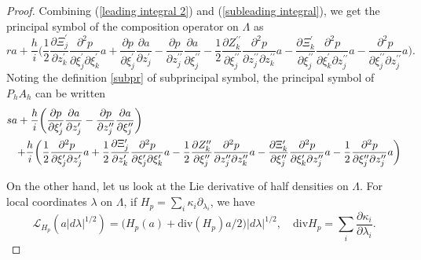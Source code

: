 \documentclass[10pt, a4paper, twoside]{amsart}
\numberwithin{equation}{section}
\theoremstyle{remark}
\begin{document}
\begin{appendix}
\begin{proof}
	Combining (\ref{leading integral 2}) and (\ref{subleading integral}), we get the principal symbol of the composition operator on $\Lambda$ as $$r a + \frac{h}{i}\bigg(\frac{1}{2} \frac{\partial \Xi^\prime_j}{\partial z^\prime_k} \frac{\partial^2 p}{\partial \xi^{\prime}_j \partial \xi^{\prime}_k} a + \frac{\partial p}{\partial \xi_j^\prime}  \frac{\partial a}{\partial z_j^\prime} - \frac{\partial p}{\partial z^{\prime\prime}_j} \frac{\partial a}{\partial \xi^{\prime\prime}_j} - \frac{1}{2} \frac{\partial Z^{\prime\prime}_k}{\partial \xi^{\prime\prime}_j} \frac{\partial^2 p}{\partial z^{\prime\prime}_j \partial z^{\prime\prime}_k} a  - \frac{\partial \Xi^\prime_k}{\partial \xi^{\prime\prime}_j}\frac{\partial^2 p}{\partial \xi^\prime_k \partial z^{\prime\prime}_j} a - \frac{\partial^2 p}{\partial \xi^{\prime\prime}_j \partial z^{\prime\prime}_j} a\bigg).$$ 
	Noting the definition \eqref{subpr} of subprincipal symbol, the principal symbol of $P_hA_h$ can be written  \begin{eqnarray}
	\lefteqn{ sa + \frac{h}{i}\bigg(\frac{\partial p}{\partial \xi_j^\prime}  \frac{\partial a}{\partial z_j^\prime} - \frac{\partial p}{\partial z^{\prime\prime}_j} \frac{\partial a}{\partial \xi^{\prime\prime}_j}\bigg)} \nonumber \\ \label{principal symbol-vanishing} && + \frac{h}{i}\bigg( \frac{1}{2} \frac{\partial^2 p}{\partial \xi^{\prime}_j \partial z^{\prime}_j} a + \frac{1}{2} \frac{\partial \Xi^\prime_j}{\partial z^\prime_k} \frac{\partial^2 p}{\partial \xi^{\prime}_j \partial \xi^{\prime}_k} a - \frac{1}{2} \frac{\partial Z^{\prime\prime}_k}{\partial \xi^{\prime\prime}_j} \frac{\partial^2 p}{\partial z^{\prime\prime}_j \partial z^{\prime\prime}_k} a  - \frac{\partial \Xi^\prime_k}{\partial \xi^{\prime\prime}_j}\frac{\partial^2 p}{\partial \xi^\prime_k \partial z^{\prime\prime}_j} a - \frac{1}{2} \frac{\partial^2 p}{\partial \xi^{\prime\prime}_j \partial z^{\prime\prime}_j} a \bigg)
	\end{eqnarray}
	
	
	On the other hand, let us look at the Lie derivative of half densities on $\Lambda$. For local coordinates $\lambda$ on $\Lambda$, if $H_p = \sum_i \kappa_i \partial_{\lambda_i}$, we have 
	$$
	\mathcal{L}_{H_p}(a |d\lambda|^{1/2}) = \Big( H_p (a) + \text{div}(H_p) a/2 \Big) |d\lambda|^{1/2}, \quad \text{div} H_p = \sum_i \frac{\partial \kappa_i}{\partial \lambda_i} . 
	$$
	
	
	

\end{proof}
\end{appendix}
\end{document}

